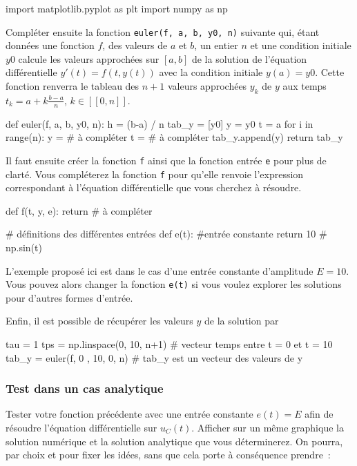 \documentclass[../main/main.tex]{subfiles}
\begin{document}
\begin{python}
	import matplotlib.pyplot as plt
	import numpy as np
\end{python}

Compléter ensuite la fonction \texttt{euler(f, a, b, y0, n)} suivante qui, étant
données une fonction $f$, des valeurs de $a$ et $b$, un entier $n$ et une
condition initiale $y0$ calcule les valeurs approchées sur $[a,b]$ de la
solution de l'équation différentielle $y'(t)=f(t,y(t))$ avec la condition
initiale $y(a)=y0$. Cette fonction renverra le tableau des $n+1$ valeurs
approchées $y_k$ de $y$ aux temps $t_k=a+k \frac{b-a}{n}$, $k\in[\![0,n]\!]$.

\begin{python}
	def euler(f, a, b, y0, n):
	h = (b-a) / n
	tab_y = [y0]
	y = y0
	t = a
	for i in range(n):
	y = # à compléter
	t = # à compléter
	tab_y.append(y)
	return tab_y
\end{python}

Il faut ensuite créer la fonction \texttt{f} ainsi que la fonction entrée
\texttt{e} pour plus de clarté. Vous compléterez la fonction \texttt{f} pour
qu'elle renvoie l'expression correspondant à l'équation différentielle que vous
cherchez à résoudre.

\begin{python}
	def f(t, y, e):
	return # à compléter

	# définitions des différentes entrées
	def e(t): #entrée constante
	return 10 # np.sin(t)
\end{python}

L'exemple proposé ici est dans le cas d'une entrée constante d'amplitude $E =
	10$. Vous pouvez alors changer la fonction \texttt{e(t)} si vous voulez explorer
les solutions pour d'autres formes d'entrée.

Enfin, il est possible de récupérer les valeurs $y$ de la solution par

\begin{python}
	tau = 1
	tps = np.linspace(0, 10, n+1) # vecteur temps entre t = 0 et t = 10
	tab_y = euler(f, 0 , 10, 0, n) # tab_y est un vecteur des valeurs de y
\end{python}

\subsubsection{Test dans un cas analytique}

Tester votre fonction précédente avec une entrée constante $e(t) = E$ afin de
résoudre l'équation différentielle sur $u_{C}(t)$. Afficher sur un même
graphique la solution numérique et la solution analytique que vous déterminerez.
On pourra, par choix et pour fixer les idées, sans que cela porte à conséquence
prendre~:
\end{document}
